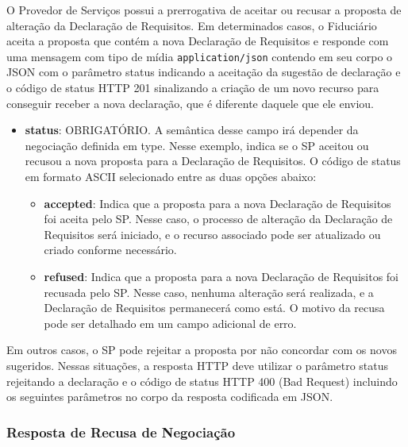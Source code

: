 O Provedor de Serviços possui a prerrogativa de aceitar ou recusar a proposta de alteração da Declaração de Requisitos. Em determinados casos, o Fiduciário aceita a proposta que contém a nova Declaração de Requisitos e responde com uma mensagem com tipo de mídia \texttt{application/json} contendo em seu corpo o \acs{JSON} com o parâmetro status indicando a aceitação da sugestão de declaração e o código de status HTTP 201 sinalizando a criação de um novo recurso para conseguir receber a nova declaração, que é diferente daquele que ele enviou. 



\begin{itemize}
    
   \item \textbf{status}: OBRIGATÓRIO. A semântica desse campo irá depender da negociação definida em type. Nesse exemplo, indica se o \acs{SP} aceitou ou recusou a nova proposta para a Declaração de Requisitos. O código de status em formato ASCII selecionado entre as duas opções abaixo:

    \begin{itemize}
        \item \textbf{accepted}: Indica que a proposta para a nova Declaração de Requisitos foi aceita pelo \acs{SP}. Nesse caso, o processo de alteração da Declaração de Requisitos será iniciado, e o recurso associado pode ser atualizado ou criado conforme necessário.
        
        \item \textbf{refused}: Indica que a proposta para a nova Declaração de Requisitos foi recusada pelo \acs{SP}. Nesse caso, nenhuma alteração será realizada, e a Declaração de Requisitos permanecerá como está. O motivo da recusa pode ser detalhado em um campo adicional de erro.
    \end{itemize}

\end{itemize}

Em outros casos, o \acs{SP} pode rejeitar a proposta por não concordar com os novos sugeridos. Nessas situações, a resposta HTTP deve utilizar o parâmetro status rejeitando a declaração e o código de status HTTP 400 (Bad Request) incluindo os seguintes parâmetros no corpo da resposta codificada em JSON.

\subsubsection*{Resposta de Recusa de Negociação}\label{subsubsection:response-negotiation-error}


